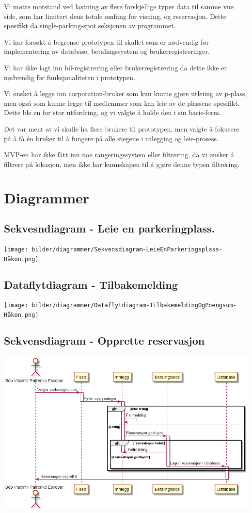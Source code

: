 \documentclass[12pt]{article}
\begin{document}
    Vi møtte motstand ved lastning av flere forskjellige typer data til samme vue side, som har limitert dens totale omfang for visning, og reservasjon. Dette spesifikt da single-parking-spot seksjonen av programmet.
    
    Vi har forsøkt å begrense prototypen til skallet som er nødvendig før implementering av database, betalingssystem og brukerregistreringer.
    
    Vi har ikke lagt inn bil-registrering eller brukerregistrering da dette ikke er nødvendig for funksjonaliteten i prototypen. 
    
    Vi ønsket å legge inn corporation-bruker som kun kunne gjøre utleiing av p-plass, men også som kunne legge til medlemmer som kan leie av de plassene spesifikt. Dette ble en for stor utfordring, og vi valgte å holde den i sin basis-form.
    
    Det var ment at vi skulle ha flere brukere til prototypen, men valgte å fokusere på å få én bruker til å fungere på alle stegene i utlegging og leie-prosess.
    
    MVP-en har ikke fått inn noe rangeringssystem eller filtrering, da vi ønsker å filtrere på lokasjon, men ikke har kunnskapen til å gjøre denne typen filtrering.

\section{Diagrammer}
    \subsection{Sekvesndiagram - Leie en parkeringplass.}
    \texttt{[image: bilder/diagrammer/Sekvensdiagram-LeieEnParkeringsplass-Håkon.png]}

    \subsection{Dataflytdiagram - Tilbakemelding}
    \texttt{[image: bilder/diagrammer/Dataflytdiagram-TilbakemeldingOgPoengsum-Håkon.png]}

    \subsection{Sekvensdiagram - Opprette reservasjon}
    \includegraphics[max width=\textwidth]{bilder/diagrammer/opprette reservasjon_sekvensdiagram.png}
\end{document}
